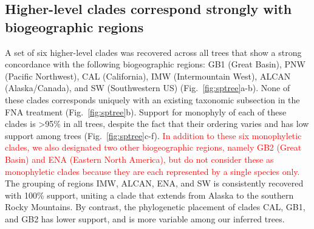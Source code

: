 \documentclass[11pt]{article}
\begin{document}
\subsection{Higher-level clades correspond strongly with biogeographic regions}
A set of six higher-level clades was recovered across all trees that show a strong
concordance with the following biogeographic regions: GB1 (Great Basin), PNW (Pacific Northwest), CAL (California), IMW (Intermountain West), ALCAN (Alaska/Canada), and SW (Southwestern US) (Fig.~\ref{fig:sptree}a-b).  
% 
None of these
clades corresponds uniquely with an existing taxonomic subsection in the FNA treatment (Fig.~\ref{fig:sptree}b). 
% 
Support for monophyly of each of these clades is >95\% in all trees, despite 
the fact that their ordering varies and has low support among trees
(Fig.~\ref{fig:sptree}c-f). \textcolor{red}{In addition to these six monophyletic clades, we also designated two other biogeographic regions, namely GB2 (Great Basin) and ENA (Eastern North America), but do not consider these as monophyletic clades because they are each represented by a single species only.}
% 
The grouping of regions IMW, ALCAN, ENA, and SW is consistently recovered with 
100\% support, uniting a clade that extends from Alaska to the southern Rocky
Mountains. By contrast, the phylogenetic placement of clades CAL, GB1, and GB2 has lower support, and is more variable among our inferred trees. 
% 
% 
% 
% 
\end{document}
